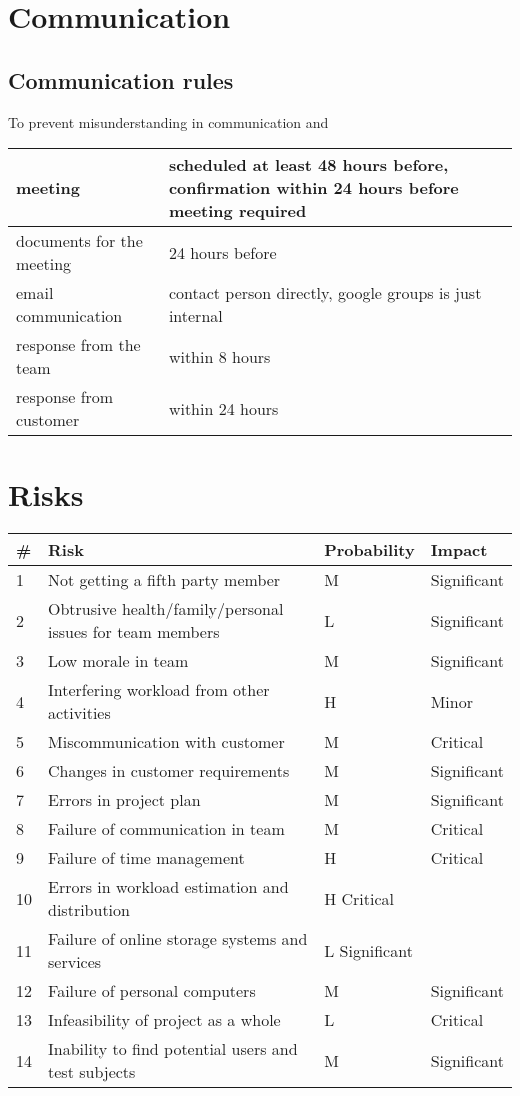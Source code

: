 \section{Communication}
\subsection{Communication rules}
To prevent misunderstanding in communication and

\begin{tabularx}{\textwidth}{ | l | X | }
  \hline
  meeting & scheduled at least 48 hours before, confirmation within 24 hours before meeting required \\ \hline
  documents for the meeting & 24 hours before \\ \hline
  email communication & contact person directly, google groups is just internal \\ \hline
  response from the team & within 8 hours \\ \hline
  response from customer & within 24 hours \\ \hline
\end{tabularx}
\clearpage

\section{Risks}
\begin{tabularx}{\textwidth}{ | l | l | l | l | }
  \hline
  \textbf{#} & \textbf{Risk} & \textbf{Probability} & \textbf{Impact} \\ \hline
  1 & Not getting a fifth party member & M & Significant \\ \hline
  2 & Obtrusive health/family/personal issues for team members & L & Significant \\ \hline
  3 & Low morale in team & M & Significant \\ \hline
  4 & Interfering workload from other activities & H & Minor \\ \hline
  5 & Miscommunication with customer & M & Critical \\ \hline
  6 & Changes in customer requirements & M & Significant \\ \hline
  7 & Errors in project plan & M & Significant \\ \hline
  8 & Failure of communication in team & M & Critical \\ \hline
  9 & Failure of time management & H & Critical \\ \hline
 10 & Errors in workload estimation and distribution & H	Critical \\ \hline
 11 & Failure of online storage systems and services & L	Significant \\ \hline
 12 & Failure of personal computers & M & Significant \\ \hline
 13 & Infeasibility of project as a whole & L & Critical \\ \hline
 14 & Inability to find potential users and test subjects & M & Significant \\ \hline
\end{tabularx}







